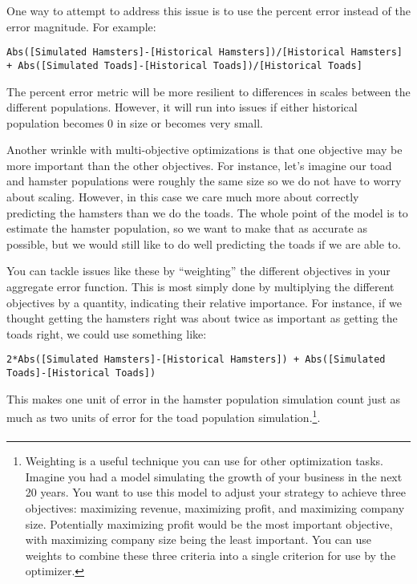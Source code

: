 \documentclass[]{memoir}
\begin{document}
One way to attempt to address this issue is to use the percent error
instead of the error magnitude. For example:

\lstinline!Abs([Simulated Hamsters]-[Historical Hamsters])/[Historical Hamsters] + Abs([Simulated Toads]-[Historical Toads])/[Historical Toads]!

The percent error metric will be more resilient to differences in scales
between the different populations. However, it will run into issues if
either historical population becomes 0 in size or becomes very small.

Another wrinkle with multi-objective optimizations is that one objective
may be more important than the other objectives. For instance, let's
imagine our toad and hamster populations were roughly the same size so
we do not have to worry about scaling. However, in this case we care
much more about correctly predicting the hamsters than we do the toads.
The whole point of the model is to estimate the hamster population, so
we want to make that as accurate as possible, but we would still like to
do well predicting the toads if we are able to.

You can tackle issues like these by ``weighting'' the different
objectives in your aggregate error function. This is most simply done by
multiplying the different objectives by a quantity, indicating their
relative importance. For instance, if we thought getting the hamsters
right was about twice as important as getting the toads right, we could
use something like:

\lstinline!2*Abs([Simulated Hamsters]-[Historical Hamsters]) + Abs([Simulated Toads]-[Historical Toads])!

This makes one unit of error in the hamster population simulation count
just as much as two units of error for the toad population
simulation.\footnote{Weighting is a useful technique you can use for
  other optimization tasks. Imagine you had a model simulating the
  growth of your business in the next 20 years. You want to use this
  model to adjust your strategy to achieve three objectives: maximizing
  revenue, maximizing profit, and maximizing company size. Potentially
  maximizing profit would be the most important objective, with
  maximizing company size being the least important. You can use weights
  to combine these three criteria into a single criterion for use by the
  optimizer.}.

\paragraph{}
\end{document}
